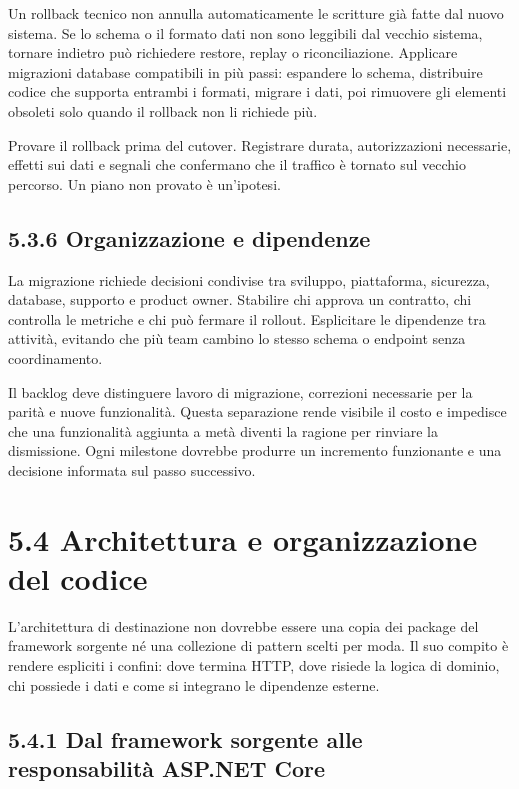 \documentclass[
  italian,
  10pt,
]{book}
\begin{document}
Un rollback tecnico non annulla automaticamente le scritture già fatte
dal nuovo sistema. Se lo schema o il formato dati non sono leggibili dal
vecchio sistema, tornare indietro può richiedere restore, replay o
riconciliazione. Applicare migrazioni database compatibili in più passi:
espandere lo schema, distribuire codice che supporta entrambi i formati,
migrare i dati, poi rimuovere gli elementi obsoleti solo quando il
rollback non li richiede più.

Provare il rollback prima del cutover. Registrare durata, autorizzazioni
necessarie, effetti sui dati e segnali che confermano che il traffico è
tornato sul vecchio percorso. Un piano non provato è un'ipotesi.

\subsection{5.3.6 Organizzazione e
dipendenze}\label{organizzazione-e-dipendenze}

La migrazione richiede decisioni condivise tra sviluppo, piattaforma,
sicurezza, database, supporto e product owner. Stabilire chi approva un
contratto, chi controlla le metriche e chi può fermare il rollout.
Esplicitare le dipendenze tra attività, evitando che più team cambino lo
stesso schema o endpoint senza coordinamento.

Il backlog deve distinguere lavoro di migrazione, correzioni necessarie
per la parità e nuove funzionalità. Questa separazione rende visibile il
costo e impedisce che una funzionalità aggiunta a metà diventi la
ragione per rinviare la dismissione. Ogni milestone dovrebbe produrre un
incremento funzionante e una decisione informata sul passo successivo.

\section{5.4 Architettura e organizzazione del
codice}\label{architettura-e-organizzazione-del-codice}

L'architettura di destinazione non dovrebbe essere una copia dei package
del framework sorgente né una collezione di pattern scelti per moda. Il
suo compito è rendere espliciti i confini: dove termina HTTP, dove
risiede la logica di dominio, chi possiede i dati e come si integrano le
dipendenze esterne.

\subsection{5.4.1 Dal framework sorgente alle responsabilità ASP.NET
Core}\label{dal-framework-sorgente-alle-responsabilituxe0-asp.net-core}
\end{document}
